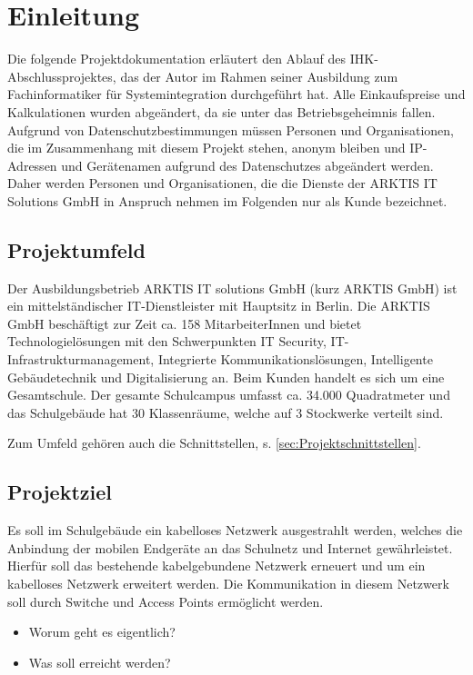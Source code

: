 \newpage
\section{Einleitung}
\label{sec:Einleitung}
Die folgende Projektdokumentation erläutert den Ablauf des IHK-Abschlussprojektes, das der Autor im Rahmen seiner Ausbildung zum Fachinformatiker für Systemintegration durchgeführt hat. Alle Einkaufspreise und Kalkulationen wurden abgeändert, da sie unter das Betriebsgeheimnis fallen. Aufgrund von Datenschutzbestimmungen müssen Personen und Organisationen, die im Zusammenhang mit diesem Projekt stehen, anonym bleiben und IP-Adressen und Gerätenamen aufgrund des Datenschutzes abgeändert werden. Daher werden Personen und Organisationen, die die Dienste der ARKTIS IT Solutions GmbH in Anspruch nehmen im Folgenden nur als Kunde bezeichnet. 

\subsection{Projektumfeld} 
\label{sec:Projektumfeld}
Der Ausbildungsbetrieb ARKTIS IT solutions GmbH (kurz ARKTIS GmbH) ist ein mittelständischer IT-Dienstleister mit Hauptsitz in Berlin. Die ARKTIS GmbH beschäftigt zur Zeit ca. 158 MitarbeiterInnen und bietet Technologielösungen mit den Schwerpunkten IT Security, IT-Infrastrukturmanagement, Integrierte Kommunikationslösungen, Intelligente Gebäudetechnik und Digitalisierung an. Beim Kunden handelt es sich um eine Gesamtschule. Der gesamte Schulcampus umfasst ca. 34.000 Quadratmeter und das Schulgebäude hat 30 Klassenräume, welche auf 3 Stockwerke verteilt sind.   

Zum Umfeld gehören auch die Schnittstellen, s. \ref{sec:Projektschnittstellen}.

\subsection{Projektziel} 
\label{sec:Projektziel}
Es soll im Schulgebäude ein kabelloses Netzwerk ausgestrahlt werden, welches die Anbindung der mobilen Endgeräte an das Schulnetz und Internet gewährleistet. Hierfür soll das bestehende kabelgebundene Netzwerk erneuert und um ein kabelloses Netzwerk erweitert werden. Die Kommunikation in diesem Netzwerk soll durch Switche und Access Points ermöglicht werden. 
\begin{itemize}
	\item Worum geht es eigentlich?
	\item Was soll erreicht werden?
\end{itemize}


